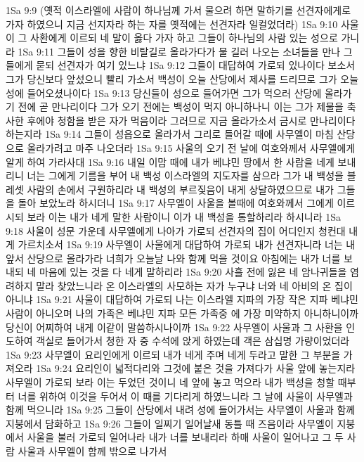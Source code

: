 1Sa 9:9  (옛적 이스라엘에 사람이 하나님께 가서 물으려 하면 말하기를 선견자에게로 가자 하였으니 지금 선지자라 하는 자를 옛적에는 선견자라 일컬었더라)
1Sa 9:10  사울이 그 사환에게 이르되 네 말이 옳다 가자 하고 그들이 하나님의 사람 있는 성으로 가니라
1Sa 9:11  그들이 성을 향한 비탈길로 올라가다가 물 길러 나오는 소녀들을 만나 그들에게 묻되 선견자가 여기 있느냐
1Sa 9:12  그들이 대답하여 가로되 있나이다 보소서 그가 당신보다 앞섰으니 빨리 가소서 백성이 오늘 산당에서 제사를 드리므로 그가 오늘 성에 들어오셨나이다
1Sa 9:13  당신들이 성으로 들어가면 그가 먹으러 산당에 올라가기 전에 곧 만나리이다 그가 오기 전에는 백성이 먹지 아니하나니 이는 그가 제물을 축사한 후에야 청함을 받은 자가 먹음이라 그러므로 지금 올라가소서 금시로 만나리이다 하는지라
1Sa 9:14  그들이 성읍으로 올라가서 그리로 들어갈 때에 사무엘이 마침 산당으로 올라가려고 마주 나오더라
1Sa 9:15  사울의 오기 전 날에 여호와께서 사무엘에게 알게 하여 가라사대
1Sa 9:16  내일 이맘 때에 내가 베냐민 땅에서 한 사람을 네게 보내리니 너는 그에게 기름을 부어 내 백성 이스라엘의 지도자를 삼으라 그가 내 백성을 블레셋 사람의 손에서 구원하리라 내 백성의 부르짖음이 내게 상달하였으므로 내가 그들을 돌아 보았노라 하시더니
1Sa 9:17  사무엘이 사울을 볼때에 여호와께서 그에게 이르시되 보라 이는 내가 네게 말한 사람이니 이가 내 백성을 통할하리라 하시니라
1Sa 9:18  사울이 성문 가운데 사무엘에게 나아가 가로되 선견자의 집이 어디인지 청컨대 내게 가르치소서
1Sa 9:19  사무엘이 사울에게 대답하여 가로되 내가 선견자니라 너는 내 앞서 산당으로 올라가라 너희가 오늘날 나와 함께 먹을 것이요 아침에는 내가 너를 보내되 네 마음에 있는 것을 다 네게 말하리라
1Sa 9:20  사흘 전에 잃은 네 암나귀들을 염려하지 말라 찾았느니라 온 이스라엘의 사모하는 자가 누구냐 너와 네 아비의 온 집이 아니냐
1Sa 9:21  사울이 대답하여 가로되 나는 이스라엘 지파의 가장 작은 지파 베냐민 사람이 아니오며 나의 가족은 베냐민 지파 모든 가족중 에 가장 미약하지 아니하니이까 당신이 어찌하여 내게 이같이 말씀하시나이까
1Sa 9:22  사무엘이 사울과 그 사환을 인도하여 객실로 들어가서 청한 자 중 수석에 앉게 하였는데 객은 삼십명 가량이었더라
1Sa 9:23  사무엘이 요리인에게 이르되 내가 네게 주며 네게 두라고 말한 그 부분을 가져오라
1Sa 9:24  요리인이 넓적다리와 그것에 붙은 것을 가져다가 사울 앞에 놓는지라 사무엘이 가로되 보라 이는 두었던 것이니 네 앞에 놓고 먹으라 내가 백성을 청할 때부터 너를 위하여 이것을 두어서 이 때를 기다리게 하였느니라 그 날에 사울이 사무엘과 함께 먹으니라
1Sa 9:25  그들이 산당에서 내려 성에 들어가서는 사무엘이 사울과 함께 지붕에서 담화하고
1Sa 9:26  그들이 일찌기 일어날새 동틀 때 즈음이라 사무엘이 지붕에서 사울을 불러 가로되 일어나라 내가 너를 보내리라 하매 사울이 일어나고 그 두 사람 사울과 사무엘이 함께 밖으로 나가서
